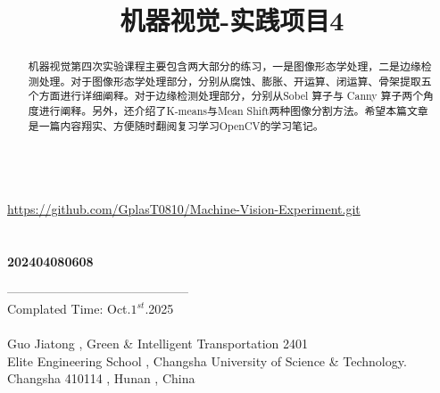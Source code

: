 \documentclass[11pt]{article}
\title{\textbf{{\huge 机器视觉-实践项目4}}}
\begin{document}
    
    \maketitle
    
      \vspace*{4em}
    \begin{abstract}
    	机器视觉第四次实验课程主要包含两大部分的练习，一是图像形态学处理，二是边缘检测处理。对于图像形态学处理部分，分别从腐蚀、膨胀、开运算、闭运算、骨架提取五个方面进行详细阐释。对于边缘检测处理部分，分别从Sobel 算子与 Canny 算子两个角度进行阐释。另外，还介绍了K-means与Mean Shift两种图像分割方法。希望本篇文章是一篇内容翔实、方便随时翻阅复习学习OpenCV的学习笔记。
    \end{abstract}
    
    \begin{center}
    	\\\underline{https://github.com/GplasT0810/Machine-Vision-Experiment.git}\\
    	\\
    	\\
    	\vspace{0.7em}\textbf{{\large 202404080608}}\\
    \end{center}
    \newpage
    
    \tableofcontents
    \begin{center}
    	\vspace{11em}
    \end{center}
    
    \vspace*{13em}--------------------------------------------\\
    Complated Time: Oct.$1^{st}$.2025\\ \\
    Guo Jiatong , Green \& Intelligent Transportation 2401\\
    Elite Engineering School , Changsha University of Science \& Technology.\\
    Changsha 410114 , Hunan , China
    
\end{document}
